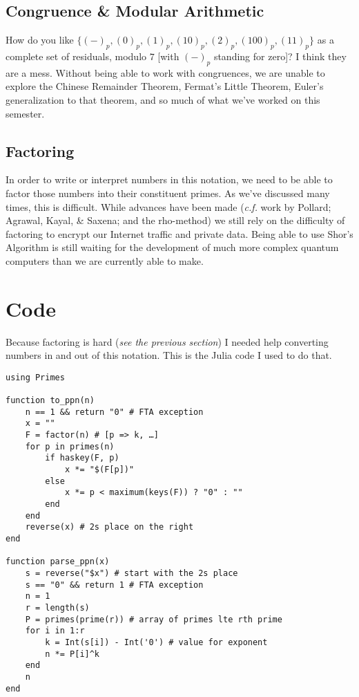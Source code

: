 \documentclass[12pt]{article}
\newcommand{\ppn}[1]{(#1)_p}
\begin{document}
\subsection*{Congruence \& Modular Arithmetic}
How do you like $\{ \ppn{-}, \ppn{0}, \ppn{1}, \ppn{10}, \ppn{2}, \ppn{100}, \ppn{11} \}$ as a complete set of residuals, modulo $7$ [with $\ppn{-}$ standing for zero]? I think they are a mess. Without being able to work with congruences, we are unable to explore the Chinese Remainder Theorem, Fermat's Little Theorem, Euler's generalization to that theorem, and so much of what we've worked on this semester.

\subsection*{Factoring}
In order to write or interpret numbers in this notation, we need to be able to factor those numbers into their constituent primes. As we've discussed many times, this is difficult. While advances have been made (\textit{c.f.} work by Pollard; Agrawal, Kayal, \& Saxena; and the rho-method) we still rely on the difficulty of factoring to encrypt our Internet traffic and private data. Being able to use Shor's Algorithm is still waiting for the development of much more complex quantum computers than we are currently able to make.

\newpage

\section*{Code}
Because factoring is hard (\textit{see the previous section}) I needed help converting numbers in and out of this notation. This is the Julia code I used to do that.
\begin{verbatim}
using Primes

function to_ppn(n)
    n == 1 && return "0" # FTA exception
    x = ""
    F = factor(n) # [p => k, …]
    for p in primes(n)
        if haskey(F, p)
            x *= "$(F[p])"
        else
            x *= p < maximum(keys(F)) ? "0" : ""
        end
    end
    reverse(x) # 2s place on the right
end

function parse_ppn(x)
    s = reverse("$x") # start with the 2s place
    s == "0" && return 1 # FTA exception
    n = 1
    r = length(s)
    P = primes(prime(r)) # array of primes lte rth prime
    for i in 1:r
        k = Int(s[i]) - Int('0') # value for exponent
        n *= P[i]^k
    end
    n
end
\end{verbatim}
\end{document}
